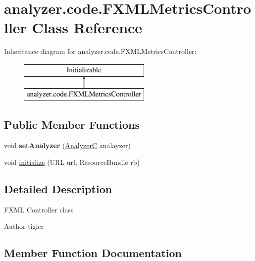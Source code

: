 \hypertarget{classanalyzer_1_1code_1_1FXMLMetricsController}{}\section{analyzer.\+code.\+F\+X\+M\+L\+Metrics\+Controller Class Reference}
\label{classanalyzer_1_1code_1_1FXMLMetricsController}
Inheritance diagram for analyzer.\+code.\+F\+X\+M\+L\+Metrics\+Controller\+:\begin{figure}[H]
\begin{center}
\leavevmode
\includegraphics[height=2.000000cm]{classanalyzer_1_1code_1_1FXMLMetricsController}
\end{center}
\end{figure}
\subsection*{Public Member Functions}
\begin{DoxyCompactItemize}
\item 
\mbox{\label{classanalyzer_1_1code_1_1FXMLMetricsController_a2d7edaf36849da79f67532a3dc789d18}} 
void {\bfseries set\+Analyzer} (\hyperlink{classanalyzer_1_1code_1_1AnalyzerC}{AnalyzerC} analayzer)
\item 
void \hyperlink{classanalyzer_1_1code_1_1FXMLMetricsController_ae7fea4d81f2544c571d453a61f24e845}{initialize} (U\+RL url, Resource\+Bundle rb)
\end{DoxyCompactItemize}


\subsection{Detailed Description}
F\+X\+ML Controller class

\begin{DoxyAuthor}{Author}
tigler 
\end{DoxyAuthor}


\subsection{Member Function Documentation}
\mbox{\label{classanalyzer_1_1code_1_1FXMLMetricsController_ae7fea4d81f2544c571d453a61f24e845}} 
